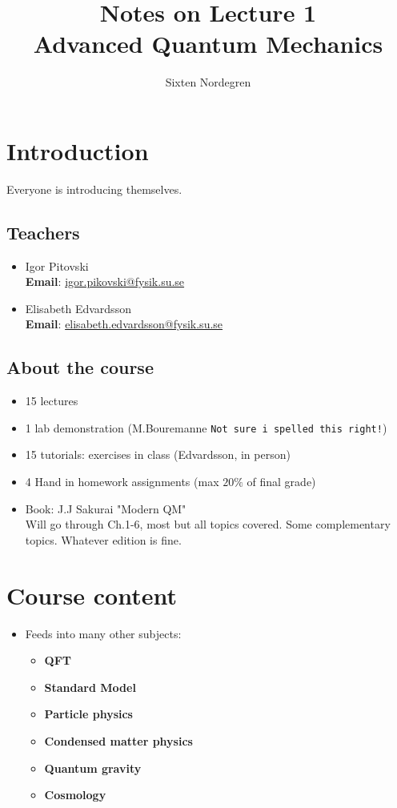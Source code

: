 \documentclass{elsarticle}
\title{Notes on Lecture 1 \\ Advanced Quantum Mechanics}
\author{Sixten Nordegren}
\begin{document}
\maketitle
	\section*{Introduction}
	Everyone is introducing themselves.
	\subsection*{Teachers}
	\begin{itemize}

		\item Igor Pitovski \\
		\textbf{Email}: \url{igor.pikovski@fysik.su.se} 
		\item Elisabeth Edvardsson \\
		\textbf{Email}: \url{elisabeth.edvardsson@fysik.su.se} 
	\end{itemize}
	\subsection*{About the course}
	\begin{itemize}
		\item 15 lectures
		\item 1 lab demonstration (M.Bouremanne \texttt{Not sure i spelled 
			this right!})
		\item 15 tutorials: exercises in class (Edvardsson, in person)
		\item 4 Hand in homework assignments (max $20 \%$ of final grade)
		\item Book: J.J Sakurai "Modern QM" \\
			Will go through Ch.1-6, most but all topics covered.
			Some complementary topics. Whatever edition is fine.
	\end{itemize}

	\section*{Course content}
	\begin{itemize}
		\item Feeds into many other subjects:
			\begin{itemize}
				\item \textbf{QFT}
				\item \textbf{Standard Model}
				\item \textbf{Particle physics}
				\item \textbf{Condensed matter physics}
				\item \textbf{Quantum gravity}
				\item \textbf{Cosmology}

			\end{itemize}
	\end{itemize}
\end{document}
